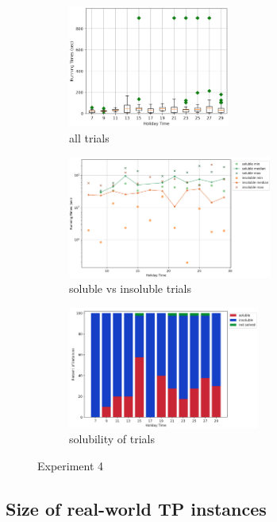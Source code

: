\documentclass{mpaper}
\begin{document}
\begin{figure}[!ht]
    \centering
    \begin{subfigure}[b]{0.30\textwidth}
        \includegraphics[width=\textwidth, height=4cm]{images/experiments/varyt/varyT.png}
        \caption{all trials}
        \label{fig:exp4all}
    \end{subfigure}
    \begin{subfigure}[b]{0.36\textwidth}
        \includegraphics[width=\textwidth, height=4cm]{images/experiments/varyt/satunsat_t.png}
        \caption{soluble vs insoluble trials}
        \label{fig:exp4sat}
    \end{subfigure}
    \begin{subfigure}[b]{0.32\textwidth}
        \includegraphics[width=\textwidth, height=4cm]{images/experiments/varyt/varyTsat.png}
        \caption{solubility of trials}
        \label{fig:varytsat}
    \end{subfigure}
    \caption{Experiment 4}
    \label{experiment4}
\end{figure}
\vspace{-1mm}

\subsection{Size of real-world TP instances}
\label{tpinstancesize}
\end{document}
